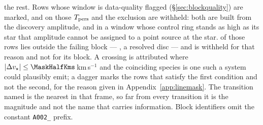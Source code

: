 \begin{table}
{the rest. Rows whose window is data-quality flagged
(\S\ref{sec:blockquality}) are marked, and on those $T_{\rm pers}$ and the
exclusion are withheld: both are built from the discovery amplitude, and in a
window whose control ring stands as high as its star that amplitude cannot be
assigned to a point source at the star. \BkFlagNCrossOther{} of those rows
lies outside the failing block --- \BkFlagOtherStar, a resolved disc --- and
is withheld for that reason and not for its block. A
crossing is attributed where
$|\Delta v_\star|\le\MaskHalfKms$\,km\,s$^{-1}$ and the coinciding species is
one such a system could plausibly emit; a dagger marks the \MkNSODecide{}
rows that satisfy the first condition and not the second, for the reason given
in Appendix~\ref{app:linemask}. The transition named is the
nearest in that frame, so far from every transition it is the magnitude and
not the name that carries information. Block identifiers omit the constant
\texttt{A002\_} prefix.}
\label{tab:ledger}
\tiny

\end{table}

\begin{table}
\centering
\caption{\emph{The crossing ledger, continued.} The remaining
\CxLedgerPartTwo{} of the \EvNCrossRaw{} threshold crossings, in the same
order and with the same columns as Table~\ref{tab:ledger}, whose caption
defines them. These too are primary crossings, one to a window.}
\label{tab:ledgercont}
\tiny

\end{table}
